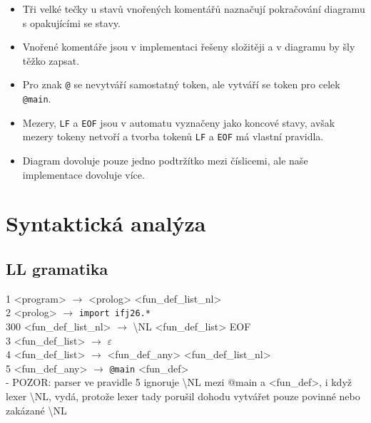 \documentclass[10pt,a4paper]{article}
\begin{document}
\begin{itemize}
\item Tři velké tečky u stavů vnořených komentářů naznačují pokračování diagramu 
s opakujícími se stavy.
\item Vnořené komentáře jsou v implementaci řešeny složitěji a v diagramu 
by šly těžko zapsat.
\item Pro znak \texttt{@} se nevytváří samostatný token, ale 
vytváří se token pro celek \texttt{@main}.
\item Mezery, \texttt{LF} a \texttt{EOF} jsou v automatu vyznačeny jako koncové stavy,
avšak mezery tokeny netvoří a tvorba tokenů \texttt{LF} a \texttt{EOF} má vlastní pravidla.
\item Diagram dovoluje pouze jedno podtržítko mezi číslicemi, ale naše implementace 
dovoluje více.
\end{itemize}

\section{Syntaktická analýza}
\subsection{LL gramatika}

1 <program> $\to$ <prolog> <fun\_def\_list\_nl> \\
2 <prolog> $\to$ \texttt{import ifj26.*} \\
300 <fun\_def\_list\_nl> $\to$ \textbackslash NL <fun\_def\_list> EOF \\
3 <fun\_def\_list> $\to$ $\varepsilon$ \\
4 <fun\_def\_list> $\to$ <fun\_def\_any> <fun\_def\_list\_nl>\\
5 <fun\_def\_any> $\to$ \texttt{@main} <fun\_def> \\
- POZOR: parser ve pravidle 5 ignoruje \textbackslash NL 
mezi @main a <fun\_def>, i když lexer \textbackslash NL, 
vydá, protože lexer tady porušil dohodu vytvářet pouze povinné 
nebo zakázané \textbackslash NL
\end{document}
